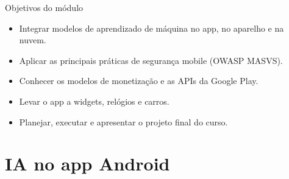 \documentclass[aspectratio=169,10pt]{beamer}
\begin{document}
\capa

\begin{frame}{Objetivos do módulo}
  \begin{conceito}
    \begin{itemize}
      \item Integrar modelos de aprendizado de máquina no app, no aparelho e na nuvem.
      \item Aplicar as principais práticas de segurança mobile (OWASP MASVS).
      \item Conhecer os modelos de monetização e as APIs da Google Play.
      \item Levar o app a widgets, relógios e carros.
      \item Planejar, executar e apresentar o projeto final do curso.
    \end{itemize}
  \end{conceito}
\end{frame}

\sumario



\section{IA no app Android}
\end{document}
